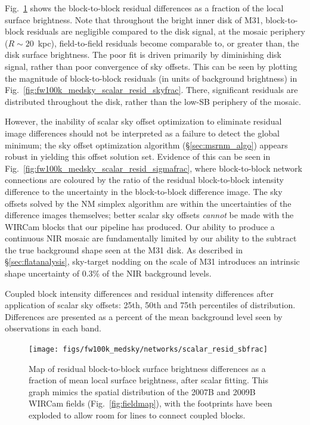 \documentclass[iop]{emulateapj}
\newcommand{\Fig}[1]{Fig.~\ref{fig:#1}}  %
\newcommand{\Sec}[1]{\S\ref{sec:#1}}  %
\begin{document}
\Fig{fw100k_medsky_scalar_resid_sbfrac} shows the block-to-block residual differences as a fraction of the local surface brightness.
Note that throughout the bright inner disk of M31, block-to-block residuals are negligible compared to the disk signal, at the mosaic periphery ($R\sim 20$~kpc), field-to-field residuals become comparable to, or greater than, the disk surface brightness.
The poor fit is driven primarily by diminishing disk signal, rather than poor convergence of sky offsets.
This can be seen by plotting the magnitude of block-to-block residuals (in units of background brightness) in \Fig{fw100k_medsky_scalar_resid_skyfrac}.
There, significant residuals are distributed throughout the disk, rather than the low-SB periphery of the mosaic.

However, the inability of scalar sky offset optimization to eliminate residual image differences should not be interpreted as a failure to detect the global minimum; the sky offset optimization algorithm (\Sec{msrnm_algo}) appears robust in yielding this offset solution set.
Evidence of this can be seen in \Fig{fw100k_medsky_scalar_resid_sigmafrac}, where block-to-block network connections are coloured by the ratio of the residual block-to-block intensity difference to the uncertainty in the block-to-block difference image.
The sky offsets solved by the NM simplex algorithm are within the uncertainties of the difference images themselves; better scalar sky offsets \emph{cannot} be made with the WIRCam blocks that our pipeline has produced.
Our ability to produce a continuous NIR mosaic are fundamentally limited by our ability to the subtract the true background shape seen at the M31 disk.
As described in \Sec{flatanalysis}, sky-target nodding on the scale of M31 introduces an intrinsic shape uncertainty of 0.3\% of the NIR background levels.

\begin{table}[t]
\centering
\caption[Coupled block differences and residual differences after
scalar sky offsets]{Coupled block intensity differences and residual intensity differences after application of scalar sky offsets: 25th, 50th and 75th percentiles of distribution.
Differences are presented as a percent of the mean background level seen by observations in each band.
}

\label{tab:fw100k_medsky_scalar_resid_diffs}
\end{table}

\begin{figure}[t]
\centering
\texttt{[image: figs/fw100k\_medsky/networks/scalar\_resid\_sbfrac]}
\caption{Map of residual block-to-block surface brightness differences as a fraction of mean local surface brightness, after scalar fitting.
  This graph mimics the spatial distribution of the 2007B and 2009B WIRCam fields (\Fig{fieldmap}), with the footprints have been exploded to allow room for lines to connect coupled blocks.
}
\label{fig:fw100k_medsky_scalar_resid_sbfrac}
\end{figure}
\end{document}
